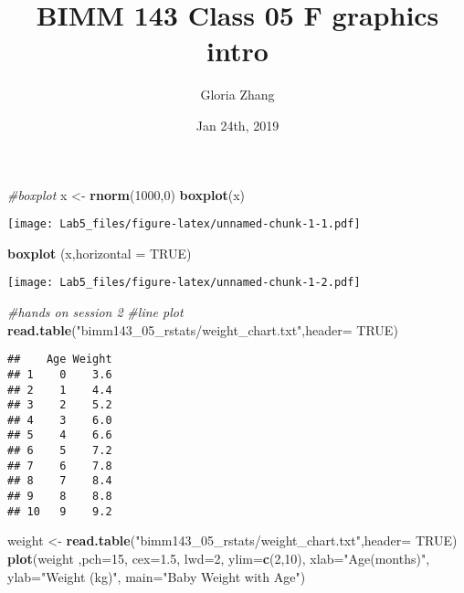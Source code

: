 \documentclass[]{article}
\title{BIMM 143 Class 05 F graphics intro}
\author{Gloria Zhang}
\date{Jan 24th, 2019}
\newenvironment{Shaded}{\begin{snugshade}}{\end{snugshade}}
\newcommand{\KeywordTok}[1]{\textcolor[rgb]{0.13,0.29,0.53}{\textbf{#1}}}
\newcommand{\DataTypeTok}[1]{\textcolor[rgb]{0.13,0.29,0.53}{#1}}
\newcommand{\DecValTok}[1]{\textcolor[rgb]{0.00,0.00,0.81}{#1}}
\newcommand{\FloatTok}[1]{\textcolor[rgb]{0.00,0.00,0.81}{#1}}
\newcommand{\StringTok}[1]{\textcolor[rgb]{0.31,0.60,0.02}{#1}}
\newcommand{\CommentTok}[1]{\textcolor[rgb]{0.56,0.35,0.01}{\textit{#1}}}
\newcommand{\OtherTok}[1]{\textcolor[rgb]{0.56,0.35,0.01}{#1}}
\newcommand{\NormalTok}[1]{#1}
\begin{document}
\maketitle

\begin{Shaded}
\begin{Highlighting}[]
\CommentTok{#boxplot}
\NormalTok{x <-}\StringTok{ }\KeywordTok{rnorm}\NormalTok{(}\DecValTok{1000}\NormalTok{,}\DecValTok{0}\NormalTok{)}
\KeywordTok{boxplot}\NormalTok{(x)}
\end{Highlighting}
\end{Shaded}

\texttt{[image: Lab5\_files/figure-latex/unnamed-chunk-1-1.pdf]}

\begin{Shaded}
\begin{Highlighting}[]
\KeywordTok{boxplot}\NormalTok{ (x,}\DataTypeTok{horizontal =} \OtherTok{TRUE}\NormalTok{)}
\end{Highlighting}
\end{Shaded}

\texttt{[image: Lab5\_files/figure-latex/unnamed-chunk-1-2.pdf]}

\begin{Shaded}
\begin{Highlighting}[]
\CommentTok{#hands on session 2}
\CommentTok{#line plot}
\KeywordTok{read.table}\NormalTok{(}\StringTok{"bimm143_05_rstats/weight_chart.txt"}\NormalTok{,}\DataTypeTok{header=} \OtherTok{TRUE}\NormalTok{)}
\end{Highlighting}
\end{Shaded}

\begin{verbatim}
##    Age Weight
## 1    0    3.6
## 2    1    4.4
## 3    2    5.2
## 4    3    6.0
## 5    4    6.6
## 6    5    7.2
## 7    6    7.8
## 8    7    8.4
## 9    8    8.8
## 10   9    9.2
\end{verbatim}

\begin{Shaded}
\begin{Highlighting}[]
\NormalTok{weight <-}\StringTok{ }\KeywordTok{read.table}\NormalTok{(}\StringTok{"bimm143_05_rstats/weight_chart.txt"}\NormalTok{,}\DataTypeTok{header=} \OtherTok{TRUE}\NormalTok{)}
\KeywordTok{plot}\NormalTok{(weight ,}\DataTypeTok{pch=}\DecValTok{15}\NormalTok{, }\DataTypeTok{cex=}\FloatTok{1.5}\NormalTok{, }\DataTypeTok{lwd=}\DecValTok{2}\NormalTok{, }\DataTypeTok{ylim=}\KeywordTok{c}\NormalTok{(}\DecValTok{2}\NormalTok{,}\DecValTok{10}\NormalTok{), }\DataTypeTok{xlab=}\StringTok{"Age(months)"}\NormalTok{, }\DataTypeTok{ylab=}\StringTok{"Weight (kg)"}\NormalTok{, }\DataTypeTok{main=}\StringTok{"Baby Weight with Age"}\NormalTok{)}
\end{Highlighting}
\end{Shaded}
\end{document}
